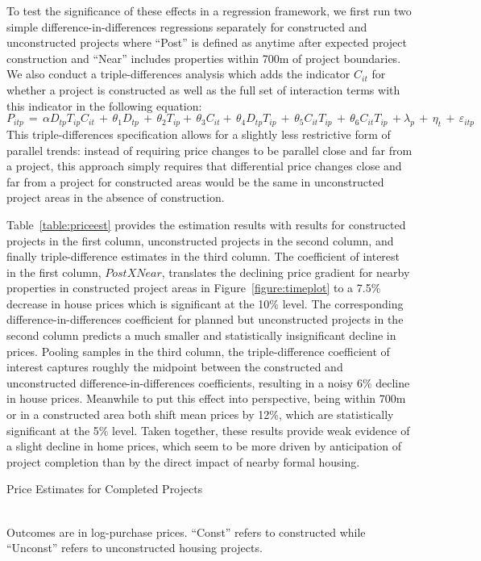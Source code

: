 \documentclass[12pt]{article}
\begin{document}
To test the significance of these effects in a regression framework, we first run two simple difference-in-differences regressions separately for constructed and unconstructed projects where ``Post'' is defined as anytime after expected project construction and ``Near'' includes properties within 700m of project boundaries.  We also conduct a triple-differences analysis which adds the indicator $C_{it}$ for whether a project is constructed as well as the full set of interaction terms with this indicator in the following equation:
\begin{equation*}
P_{itp} \, = \, \alpha D_{tp}T_{ip} C_{it} \, + \,\theta_1 D_{tp} \, + \, \theta_2 T_{ip}+ \, \theta_3 C_{it}+ \, \theta_4 D_{tp} T_{ip} \, + \, \theta_5 C_{it} T_{ip}  \, + \, \theta_6 C_{it} T_{ip} \, +  \lambda_p \,  + \, \eta_{t} \, + \, \varepsilon_{itp}
\end{equation*}
This triple-differences specification allows for a slightly less restrictive form of parallel trends: instead of requiring price changes to be parallel close and far from a project, this approach simply requires that differential price changes close and far from a project for constructed areas would be the same in unconstructed project areas in the absence of construction.  

Table~\ref{table:priceest} provides the estimation results with results for constructed projects in the first column, unconstructed projects in the second column, and finally triple-difference estimates in the third column.  The coefficient of interest in the first column, $Post X Near$, translates the declining price gradient for nearby properties in constructed project areas in Figure~\ref{figure:timeplot} to a 7.5\% decrease in house prices which is significant at the 10\% level.  The corresponding difference-in-differences coefficient for planned but unconstructed projects in the second column predicts a much smaller and statistically insignificant decline in prices.  Pooling samples in the third column, the triple-difference coefficient of interest captures roughly the midpoint between the constructed and unconstructed difference-in-differences coefficients, resulting in a noisy 6\% decline in house prices.  Meanwhile to put this effect into perspective, being within 700m or in a constructed area both shift mean prices by 12\%, which are statistically significant at the 5\% level.  Taken together, these results provide weak evidence of a slight decline in home prices, which seem to be more driven by anticipation of project completion than by the direct impact of nearby formal housing.
\begin{table}
\caption{Price Estimates for Completed Projects}\label{table:priceest}
\centering
 \\
\footnotesize{Outcomes are in log-purchase prices. ``Const'' refers to constructed while \\ ``Unconst'' refers to unconstructed housing projects.}
\end{table}
\end{document}
